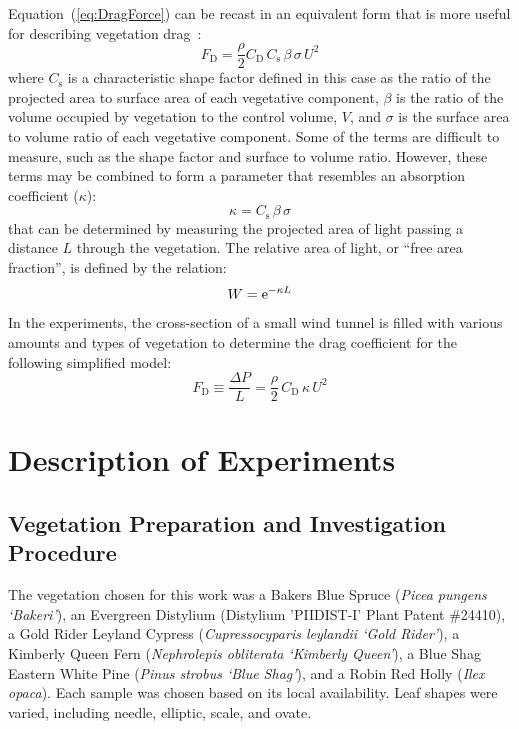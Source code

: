 \documentclass[12pt]{article}
\begin{document}
Equation~(\ref{eq:DragForce}) can be recast in an equivalent form that is more useful for describing vegetation drag~\cite{Mueller2014}:
\begin{equation}
\label{eq:DragForcea}
F_{\mathrm{D}}  = \frac{\rho}{2} C_{\mathrm{D}} \, C_{\mathrm{s}} \, \beta \, \sigma \, U^2
\end{equation}
where $C_{\mathrm{s}}$ is a characteristic shape factor defined in this case as the ratio of the projected area to surface area of each vegetative component, $\beta$ is the ratio of the volume occupied by vegetation to the control volume, $V$, and $\sigma$ is the surface area to volume ratio of each vegetative component. Some of the terms are difficult to measure, such as the shape factor and surface to volume ratio. However, these terms may be combined to form a parameter that resembles an absorption coefficient ($\kappa$):
\begin{equation}
\label{eq:Kappa}
\kappa = C_{\mathrm{s}} \, \beta \, \sigma
\end{equation}
that can be determined by measuring the projected area of light passing a distance $L$ through the vegetation. The relative area of light, or ``free area fraction'', is defined by the relation:
\begin{equation}\label{eq:WhiteFraction}
W = {\rm e}^{-\kappa L}
\end{equation}
In the experiments, the cross-section of a small wind tunnel is filled with various amounts and types of vegetation to determine the drag coefficient for the following simplified model:
\begin{equation}\label{eq:Pressure}
F_{\mathrm{D}} \equiv \frac{\Delta P}{L}  = \frac{\rho}{2} \, C_{\mathrm{D}} \, \kappa \, U^2
\end{equation}



\section{Description of Experiments}
\label{sec:Experiments}
\subsection{Vegetation Preparation and Investigation Procedure}
\label{ssec:headingscap}

The vegetation chosen for this work was a Bakers Blue Spruce ({\em Picea pungens `Bakeri'}), an Evergreen Distylium (Distylium 'PIIDIST-I' Plant Patent \#24410), a Gold Rider Leyland Cypress ({\em Cupressocyparis leylandii `Gold Rider'}), a Kimberly Queen Fern ({\em Nephrolepis obliterata `Kimberly Queen'}), a Blue Shag Eastern White Pine ({\em Pinus strobus `Blue Shag'}), and a Robin Red Holly ({\em Ilex opaca}). Each sample was chosen based on its local availability. Leaf shapes were varied, including needle, elliptic, scale, and ovate.
\end{document}
